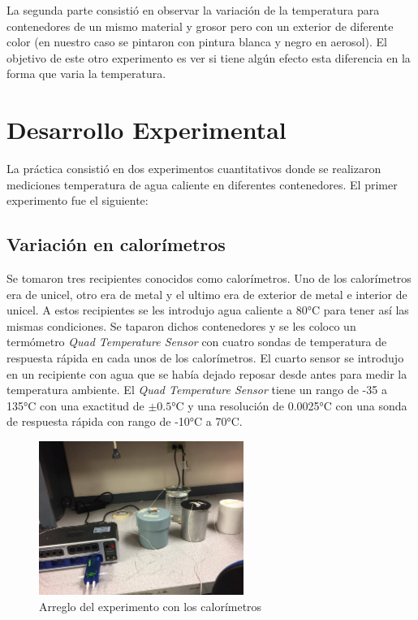 \documentclass[12pt]{article}
\begin{document}
\hspace{0.5cm} La segunda parte consistió en observar la variación de la temperatura para contenedores de un mismo material y grosor pero con un exterior de diferente color (en nuestro caso se pintaron con pintura blanca y negro en aerosol). El objetivo de este otro experimento es ver si tiene algún efecto esta diferencia en la forma que varia la temperatura.

\vspace{-.75cm}
\section{Desarrollo Experimental}
\vspace{-.5cm}
La práctica consistió en dos experimentos cuantitativos donde se realizaron mediciones temperatura de agua caliente en diferentes contenedores. El primer experimento fue el siguiente:
\vspace{-1.cm}
\subsection{Variación en calorímetros}
\vspace{-.25cm}
Se tomaron tres recipientes conocidos como calorímetros. Uno de los calorímetros era de unicel, otro era de metal y el ultimo era de exterior de metal e interior de unicel. A estos recipientes se les introdujo agua caliente a 80°C para tener así las mismas condiciones. Se taparon dichos contenedores y se les coloco un termómetro \textit{Quad Temperature Sensor} con cuatro sondas de temperatura de respuesta rápida en cada unos de los calorímetros. El cuarto sensor se introdujo en un recipiente con agua que se había dejado reposar desde antes para medir la temperatura ambiente. El \textit{Quad Temperature Sensor} tiene un rango de -35 a 135°C con una exactitud de $\pm 0.5$°C y una resolución de 0.0025°C  con una sonda de respuesta rápida con rango de -10°C a 70°C.\\

\begin{figure}[H]
\centering
\includegraphics[height=5cm]{calorimetro.jpg}
\caption{Arreglo del experimento con los calorímetros }
\end{figure}
\end{document}
